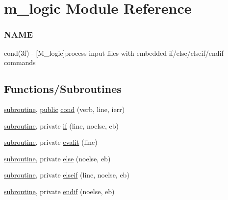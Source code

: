 \hypertarget{namespacem__logic}{}\section{m\+\_\+logic Module Reference}
\label{namespacem__logic}


\subsubsection*{N\+A\+ME}

cond(3f) -\/ \mbox{[}M\+\_\+logic\mbox{]}process input files with embedded if/else/elseif/endif commands  


\subsection*{Functions/\+Subroutines}
\begin{DoxyCompactItemize}
\item 
\hyperlink{M__stopwatch_83_8txt_acfbcff50169d691ff02d4a123ed70482}{subroutine}, \hyperlink{M__stopwatch_83_8txt_a2f74811300c361e53b430611a7d1769f}{public} \hyperlink{namespacem__logic_a169fe24f769ed7cd5336409c0722900e}{cond} (verb, line, ierr)
\item 
\hyperlink{M__stopwatch_83_8txt_acfbcff50169d691ff02d4a123ed70482}{subroutine}, private \hyperlink{namespacem__logic_a2229d0129ded7d8a34fce60334bc5938}{if} (line, noelse, eb)
\item 
\hyperlink{M__stopwatch_83_8txt_acfbcff50169d691ff02d4a123ed70482}{subroutine}, private \hyperlink{namespacem__logic_aa03730fb0581290fa8c776b633430584}{evalit} (line)
\item 
\hyperlink{M__stopwatch_83_8txt_acfbcff50169d691ff02d4a123ed70482}{subroutine}, private \hyperlink{namespacem__logic_ac51075acbd12f22ae97edd87352cba67}{else} (noelse, eb)
\item 
\hyperlink{M__stopwatch_83_8txt_acfbcff50169d691ff02d4a123ed70482}{subroutine}, private \hyperlink{namespacem__logic_abb56458f58725800b593e986b23ec2d3}{elseif} (line, noelse, eb)
\item 
\hyperlink{M__stopwatch_83_8txt_acfbcff50169d691ff02d4a123ed70482}{subroutine}, private \hyperlink{namespacem__logic_a60ae51929ab2f5d32f2a8f7e07e6debc}{endif} (noelse, eb)
\end{DoxyCompactItemize}
